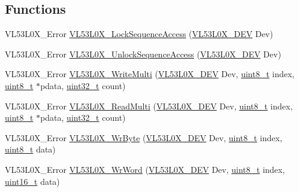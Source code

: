 \subsection*{Functions}
\begin{DoxyCompactItemize}
\item 
V\+L53\+L0\+X\+\_\+\+Error \hyperlink{group__VL53L0X__registerAccess__group_gadec2e01eacfb71e35303673dba4c525a}{V\+L53\+L0\+X\+\_\+\+Lock\+Sequence\+Access} (\hyperlink{group__VL53L0X__platform__group_ga2d6405308b1dd524b462f1b8fb97d167}{V\+L53\+L0\+X\+\_\+\+D\+EV} Dev)
\item 
V\+L53\+L0\+X\+\_\+\+Error \hyperlink{group__VL53L0X__registerAccess__group_gaa842ffc920a56baf1e790b98f52c2973}{V\+L53\+L0\+X\+\_\+\+Unlock\+Sequence\+Access} (\hyperlink{group__VL53L0X__platform__group_ga2d6405308b1dd524b462f1b8fb97d167}{V\+L53\+L0\+X\+\_\+\+D\+EV} Dev)
\item 
V\+L53\+L0\+X\+\_\+\+Error \hyperlink{group__VL53L0X__registerAccess__group_ga1bd43902504d62efa30bb7d1334becb7}{V\+L53\+L0\+X\+\_\+\+Write\+Multi} (\hyperlink{group__VL53L0X__platform__group_ga2d6405308b1dd524b462f1b8fb97d167}{V\+L53\+L0\+X\+\_\+\+D\+EV} Dev, \hyperlink{vl53l0x__types_8h_aba7bc1797add20fe3efdf37ced1182c5}{uint8\+\_\+t} index, \hyperlink{vl53l0x__types_8h_aba7bc1797add20fe3efdf37ced1182c5}{uint8\+\_\+t} $\ast$pdata, \hyperlink{vl53l0x__types_8h_a435d1572bf3f880d55459d9805097f62}{uint32\+\_\+t} count)
\item 
V\+L53\+L0\+X\+\_\+\+Error \hyperlink{group__VL53L0X__registerAccess__group_ga7ada799fc93691cea5dde0cae5e3ab58}{V\+L53\+L0\+X\+\_\+\+Read\+Multi} (\hyperlink{group__VL53L0X__platform__group_ga2d6405308b1dd524b462f1b8fb97d167}{V\+L53\+L0\+X\+\_\+\+D\+EV} Dev, \hyperlink{vl53l0x__types_8h_aba7bc1797add20fe3efdf37ced1182c5}{uint8\+\_\+t} index, \hyperlink{vl53l0x__types_8h_aba7bc1797add20fe3efdf37ced1182c5}{uint8\+\_\+t} $\ast$pdata, \hyperlink{vl53l0x__types_8h_a435d1572bf3f880d55459d9805097f62}{uint32\+\_\+t} count)
\item 
V\+L53\+L0\+X\+\_\+\+Error \hyperlink{group__VL53L0X__registerAccess__group_ga17c6507a39dac954c01ef78a6bd27ca1}{V\+L53\+L0\+X\+\_\+\+Wr\+Byte} (\hyperlink{group__VL53L0X__platform__group_ga2d6405308b1dd524b462f1b8fb97d167}{V\+L53\+L0\+X\+\_\+\+D\+EV} Dev, \hyperlink{vl53l0x__types_8h_aba7bc1797add20fe3efdf37ced1182c5}{uint8\+\_\+t} index, \hyperlink{vl53l0x__types_8h_aba7bc1797add20fe3efdf37ced1182c5}{uint8\+\_\+t} data)
\item 
V\+L53\+L0\+X\+\_\+\+Error \hyperlink{group__VL53L0X__registerAccess__group_gadc1bb94017f349842e439db5a3d0fea8}{V\+L53\+L0\+X\+\_\+\+Wr\+Word} (\hyperlink{group__VL53L0X__platform__group_ga2d6405308b1dd524b462f1b8fb97d167}{V\+L53\+L0\+X\+\_\+\+D\+EV} Dev, \hyperlink{vl53l0x__types_8h_aba7bc1797add20fe3efdf37ced1182c5}{uint8\+\_\+t} index, \hyperlink{vl53l0x__types_8h_a273cf69d639a59973b6019625df33e30}{uint16\+\_\+t} data)

\end{DoxyCompactItemize}
